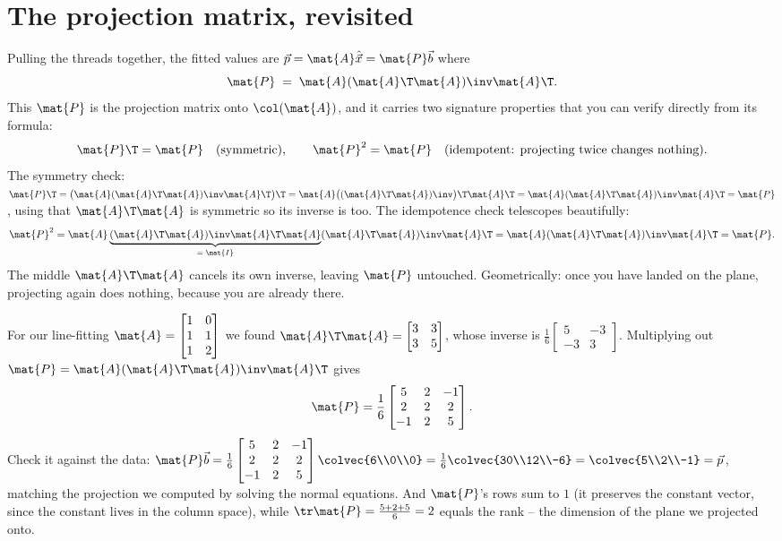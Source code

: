 \section{The projection matrix, revisited}

Pulling the threads together, the fitted values are $\vec{p}=\mat{A}\hat{\vec{x}}=\mat{P}\vec{b}$
where
\[
  \mat{P} \;=\; \mat{A}(\mat{A}\T\mat{A})\inv\mat{A}\T.
\]
This $\mat{P}$ is the projection matrix onto $\col(\mat{A})$, and it carries two signature
properties that you can verify directly from its formula:
\[
  \mat{P}\T=\mat{P}\quad(\text{symmetric}),
  \qquad
  \mat{P}^2=\mat{P}\quad(\text{idempotent: projecting twice changes nothing}).
\]
The symmetry check: $\mat{P}\T=\bigl(\mat{A}(\mat{A}\T\mat{A})\inv\mat{A}\T\bigr)\T
=\mat{A}\bigl((\mat{A}\T\mat{A})\inv\bigr)\T\mat{A}\T=\mat{A}(\mat{A}\T\mat{A})\inv\mat{A}\T=\mat{P}$,
using that $\mat{A}\T\mat{A}$ is symmetric so its inverse is too. The idempotence check telescopes
beautifully:
\[
  \mat{P}^2 = \mat{A}\underbrace{(\mat{A}\T\mat{A})\inv\mat{A}\T\mat{A}}_{=\;\mat{I}}
  (\mat{A}\T\mat{A})\inv\mat{A}\T
  = \mat{A}(\mat{A}\T\mat{A})\inv\mat{A}\T = \mat{P}.
\]
The middle $\mat{A}\T\mat{A}$ cancels its own inverse, leaving $\mat{P}$ untouched. Geometrically:
once you have landed on the plane, projecting again does nothing, because you are already there.

\begin{example}\label{ch19:Pmatrix}
For our line-fitting $\mat{A}=\begin{bmatrix}1&0\\1&1\\1&2\end{bmatrix}$ we found
$\mat{A}\T\mat{A}=\begin{bmatrix}3&3\\3&5\end{bmatrix}$, whose inverse is
$\frac{1}{6}\begin{bmatrix}5&-3\\-3&3\end{bmatrix}$. Multiplying out
$\mat{P}=\mat{A}(\mat{A}\T\mat{A})\inv\mat{A}\T$ gives
\[
  \mat{P}=\frac16\begin{bmatrix} 5 & 2 & -1\\ 2 & 2 & 2\\ -1 & 2 & 5\end{bmatrix}.
\]
Check it against the data: $\mat{P}\vec{b}=\frac16\begin{bmatrix}5&2&-1\\2&2&2\\-1&2&5\end{bmatrix}
\colvec{6\\0\\0}=\frac16\colvec{30\\12\\-6}=\colvec{5\\2\\-1}=\vec{p}$, matching the projection we
computed by solving the normal equations. And $\mat{P}$'s rows sum to $1$ (it preserves the
constant vector, since the constant lives in the column space), while $\tr\mat{P}
=\tfrac{5+2+5}{6}=2$ equals the rank -- the dimension of the plane we projected onto.
\end{example}

